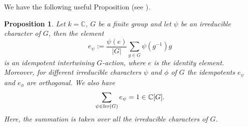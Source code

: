 \documentclass[12pt,reqno]{amsart}
\newtheorem{prop}[thm]{Proposition}
\theoremstyle{definition}
\theoremstyle{remark}
\numberwithin{equation}{section}
\newcommand{\CC}{\mathbb{C}}
\begin{document}
We have the following useful Proposition (see \cite[Section 2.4]{FH}).

\begin{prop}\label{e-projector}
    Let $k=\CC$, $G$ be a finite group and let $\psi$ be an irreducible character of $G$, then the element
    \[
    e_{\psi}:=\frac{\psi(e)}{|G|}\sum_{g\in G}\psi(g^{-1})g
    \]
    is an idempotent intertwining $G$-action, where $e$ is the identity element. Moreover, for different irreducible characters $\psi$ and $\phi$ of $G$ the idempotents $e_{\psi}$ and $e_{\phi}$ are orthogonal. We also have
    \[
        \sum_{\psi\in {\rm Irr}(G)}e_{\psi}=1\in \CC[G].
    \]
    Here, the summation is taken over all the irreducible characters of $G$.
\end{prop}



    
\end{document}
